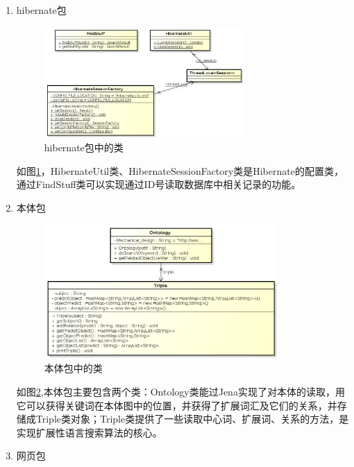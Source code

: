 \documentclass[12pt,a4paper]{article}
\begin{document}
\begin{enumerate}
	\item hibernate包
	
	\begin{figure}[htbp] 
	\centering\includegraphics[width=3in]{fig/hibernatepackage.png} 
	\caption{hibernate包中的类}\label{fig:hibernate包}
	\end{figure}

	如图\ref{fig:hibernate包}，HibernateUtil类、HibernateSessionFactory类是Hibernate的配置类，通过FindStuff类可以实现通过ID号读取数据库中相关记录的功能。
	
	\item 本体包
	
	\begin{figure}[htbp] 
	\centering\includegraphics[width=3.5in]{fig/OntologyPackage.png} 
	\caption{本体包中的类}\label{fig:ontology包}
	\end{figure}

	
	如图\ref{fig:ontology包},本体包主要包含两个类：Ontology类能过Jena实现了对本体的读取，用它可以获得关键词在本体图中的位置，并获得了扩展词汇及它们的关系，并存储成Triple类对象；Triple类提供了一些读取中心词、扩展词、关系的方法，是实现扩展性语言搜索算法的核心。
	
	\item 网页包
	

\end{enumerate}
\end{document}
